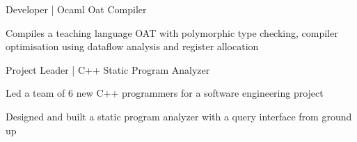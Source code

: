

\begin{cventries}
  \cventry
    {Developer | Ocaml} %
    {Oat Compiler} %
    {} %
    {} %
    {
        \begin{cvitems}
          \item {Compiles a teaching language OAT with polymorphic type checking, compiler optimisation using dataflow analysis and register allocation}
        \end{cvitems}
    }
  \cventry
    {Project Leader | C++}
    {Static Program Analyzer}
    {}
    {}
    {
        \begin{cvitems}
            \item {Led a team of 6 new C++ programmers for a software engineering project}
            \item {Designed and built a static program analyzer with a query interface from ground up}
        \end{cvitems}
    }
\end{cventries}
